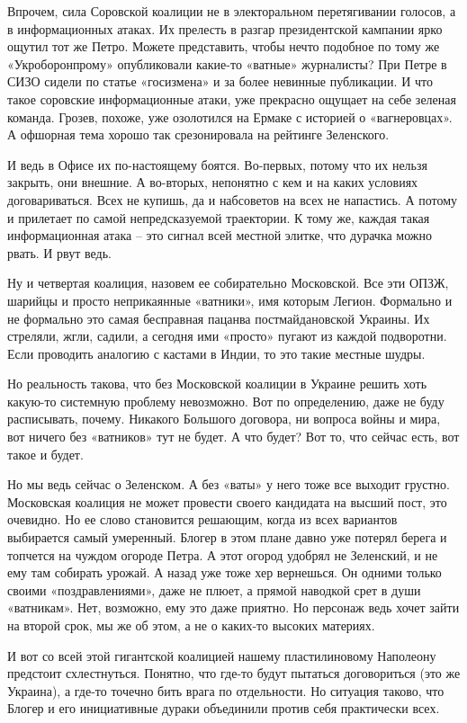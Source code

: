 Впрочем, сила Соровской коалиции не в электоральном перетягивании голосов, а в
информационных атаках. Их прелесть в разгар президентской кампании ярко ощутил
тот же Петро. Можете представить, чтобы нечто подобное по тому же
«Укроборонпрому» опубликовали какие-то «ватные» журналисты? При Петре в СИЗО
сидели по статье «госизмена» и за более невинные публикации. И что такое
соровские информационные атаки, уже прекрасно ощущает на себе зеленая команда.
Грозев, похоже, уже озолотился на Ермаке с историей о «вагнеровцах». А офшорная
тема хорошо так срезонировала на рейтинге Зеленского.

И ведь в Офисе их по-настоящему боятся. Во-первых, потому что их нельзя
закрыть, они внешние. А во-вторых, непонятно с кем и на каких условиях
договариваться. Всех не купишь, да и набсоветов на всех не напастись. А потому
и прилетает по самой непредсказуемой траектории. К тому же, каждая такая
информационная атака – это сигнал всей местной элитке, что дурачка можно рвать.
И рвут ведь.

Ну и четвертая коалиция, назовем ее собирательно Московской. Все эти ОПЗЖ,
шарийцы и просто неприкаянные «ватники», имя которым Легион. Формально и не
формально это самая бесправная пацанва постмайдановской Украины. Их стреляли,
жгли, садили, а сегодня ими «просто» пугают из каждой подворотни. Если
проводить аналогию с кастами в Индии, то это такие местные шудры.

Но реальность такова, что без Московской коалиции в Украине решить хоть
какую-то системную проблему невозможно. Вот по определению, даже не буду
расписывать, почему. Никакого Большого договора, ни вопроса войны и мира, вот
ничего без «ватников» тут не будет. А что будет? Вот то, что сейчас есть, вот
такое и будет.

Но мы ведь сейчас о Зеленском. А без «ваты» у него тоже все выходит грустно.
Московская коалиция не может провести своего кандидата на высший пост, это
очевидно. Но ее слово становится решающим, когда из всех вариантов выбирается
самый умеренный. Блогер в этом плане давно уже потерял берега и топчется на
чуждом огороде Петра. А этот огород удобрял не Зеленский, и не ему там собирать
урожай. А назад уже тоже хер вернешься. Он одними только своими
«поздравлениями», даже не плюет, а прямой наводкой срет в души «ватникам». Нет,
возможно, ему это даже приятно. Но персонаж ведь хочет зайти на второй срок, мы
же об этом, а не о каких-то высоких материях.

И вот со всей этой гигантской коалицией нашему пластилиновому Наполеону
предстоит схлестнуться. Понятно, что где-то будут пытаться договориться (это же
Украина), а где-то точечно бить врага по отдельности. Но ситуация таково, что
Блогер и его инициативные дураки объединили против себя практически всех.

